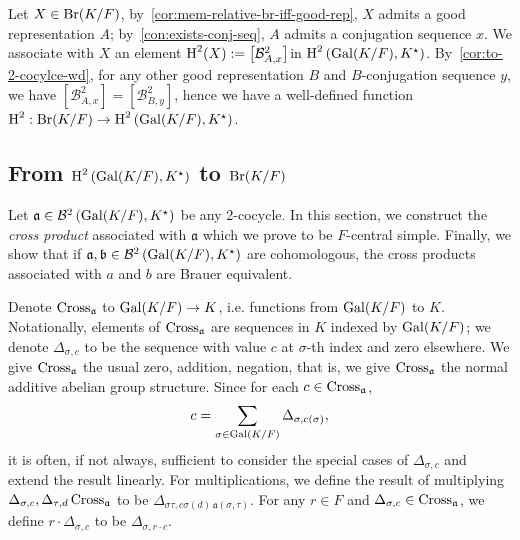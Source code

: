 \begin{construction}\label{con:br-to-snd-coh}
  Let $X \in \operatorname{Br}(K/F)$, by~\cref{cor:mem-relative-br-iff-good-rep}, $X$ admits a good representation $A$; by~\cref{con:exists-conj-seq}, $A$ admits a conjugation sequence $x$. We associate with $X$ an element $\operatorname{H}^{2}(X) := \left[\mathcal{B}^{2}_{A,x}\right]$in $\operatorname{H}^{2}\left(\operatorname{Gal}(K/F),K^{\star}\right)$. By~\cref{cor:to-2-cocylce-wd}, for any other good representation $B$ and $B$-conjugation sequence $y$, we have $\left[\mathcal{B}^{2}_{A,x}\right]=\left[\mathcal{B}^{2}_{B,y}\right]$, hence we have a well-defined function $\operatorname{H}^{2} : \operatorname{Br}(K/F) \to \operatorname{H}^{2}\left(\operatorname{Gal}(K/F),K^{\star}\right)$.
  \leanok
\end{construction}

\subsection{From $\operatorname{H}^{2}\left(\operatorname{Gal}(K/F), K^{\star}\right)$ to $\operatorname{Br}(K/F)$}

Let $\mathfrak{a} \in \mathcal{B}^{2}\left(\operatorname{Gal}(K/F), K^{\star}\right)$ be any 2-cocycle. In this section, we construct the {\em cross product\/} associated with $\mathfrak{a}$ which we prove to be $F$-central simple. Finally, we show that if $\mathfrak{a}, \mathfrak{b}\in\mathcal{B}^{2}\left(\operatorname{Gal}(K/F), K^{\star}\right)$ are cohomologous, the cross products associated with $a$ and $b$ are Brauer equivalent.

\begin{construction}\label{con:cross-product}
  Denote $\operatorname{Cross}_{\mathfrak{a}}$ to $\operatorname{Gal}(K/F) \to K$, i.e. functions from $\operatorname{Gal}(K/F)$ to $K$. Notationally, elements of $\operatorname{Cross}_{\mathfrak{a}}$ are sequences in $K$ indexed by $\operatorname{Gal}(K/F)$; we denote $\Delta_{\sigma, c}$ to be the sequence with value $c$ at $\sigma$-th index and zero elsewhere. We give $\operatorname{Cross}_{\mathfrak{a}}$ the usual zero, addition, negation, that is, we give $\operatorname{Cross}_{\mathfrak{a}}$ the normal additive abelian group structure. Since for each $c \in \operatorname{Cross}_{\mathfrak{a}}$,
  \[
    c = \sum_{\sigma\in\operatorname{Gal}(K/F)}\Delta_{\sigma, c(\sigma)},
    \]
    it is often, if not always, sufficient to consider the special cases of $\Delta_{\sigma, c}$ and extend the result linearly.
  For multiplications, we define the result of multiplying $\Delta_{\sigma, c},\Delta_{\tau, d} \operatorname{Cross}_{\mathfrak{a}}$ to be $\Delta_{\sigma\tau, c\sigma(d)\, \mathfrak{a}(\sigma,\tau)}$. For any $r \in F$ and $\Delta_{\sigma, c} \in \operatorname{Cross}_{\mathfrak{a}}$, we define $r \cdot \Delta_{\sigma, c}$ to be $\Delta_{\sigma, r\cdot c}$.
  \leanok
\end{construction}

